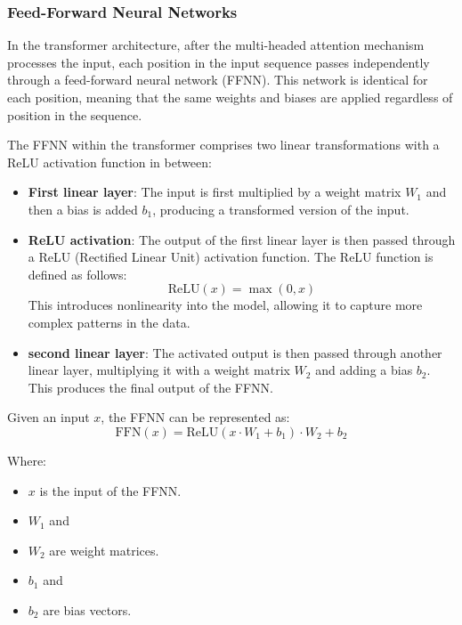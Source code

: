\begin{itemize}
\subsubsection{Feed-Forward Neural Networks}

In the transformer architecture, after the multi-headed attention mechanism processes the input, each position in the input sequence passes independently through a feed-forward neural network (FFNN). This network is identical for each position, meaning that the same weights and biases are applied regardless of position in the sequence.

The FFNN within the transformer comprises two linear transformations with a ReLU activation function in between:

\begin{itemize}
    \item \textbf{First linear layer}: The input is first multiplied by a weight matrix \( W_1 \) and then a bias is added \( b_1 \), producing a transformed version of the input.
    \item \textbf{ReLU activation}: The output of the first linear layer is then passed through a ReLU (Rectified Linear Unit) activation function. The ReLU function is defined as follows:
    \begin{equation}
        \text{ReLU}(x) = \max(0, x)
    \end{equation}
    This introduces nonlinearity into the model, allowing it to capture more complex patterns in the data.
    \item \textbf{second linear layer}: The activated output is then passed through another linear layer, multiplying it with a weight matrix \( W_2 \) and adding a bias \( b_2 \). This produces the final output of the FFNN.
\end{itemize}

Given an input \( x \), the FFNN can be represented as:
\begin{equation}
    \text{FFN}(x) = \text{ReLU}(x \cdot W_1 + b_1) \cdot W_2 + b_2
\end{equation}

Where:
\begin{itemize}
    \item \( x \) is the input of the FFNN.
    \item \( W_1 \) and \item \( W_2 \) are weight matrices.
    \item \( b_1 \) and \item \( b_2 \) are bias vectors.
\end{itemize}


\end{itemize}
